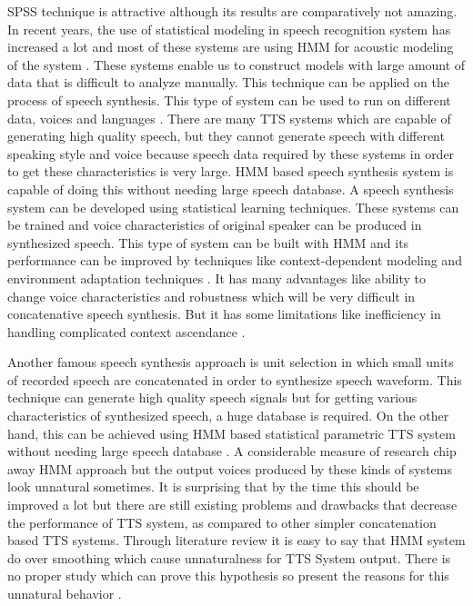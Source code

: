 SPSS technique is attractive although its results are comparatively not amazing. In recent years, the use of statistical modeling in speech recognition system has increased a lot and most of these systems are using HMM for acoustic modeling of the system \cite{donovan1999hidden}. These systems enable us to construct models with large amount of data that is difficult to analyze manually. This technique can be applied on the process of speech synthesis. This type of system can be used to run on different data, voices and languages \cite{donovan1999hidden}. There are many TTS systems which are capable of generating high quality speech, but they cannot generate speech with different speaking style and voice because speech data required by these systems in order to get these characteristics is very large. HMM based speech synthesis system \cite{tokuda2002hmm} is capable of doing this without needing large speech database. A speech synthesis system can be developed using statistical learning techniques. These systems can be trained and voice characteristics of original speaker can be produced in synthesized speech. This type of system can be built with HMM and its performance can be improved by techniques like context-dependent modeling and environment adaptation techniques \cite{tokuda2000speech}. It has many advantages like ability to change voice characteristics and robustness which will be very difficult in concatenative speech synthesis. But it has some limitations like inefficiency in handling complicated context ascendance \cite{ze2013statistical}.

Another famous speech synthesis approach is unit selection in which small units of recorded speech are concatenated in order to synthesize speech waveform. This technique can generate high quality speech signals but for getting various characteristics of synthesized speech, a huge database is required. On the other hand, this can be achieved using HMM based statistical parametric TTS system without needing large speech database \cite{zen2007hmm}. A considerable measure of research chip away HMM approach but the output voices produced by these kinds of systems look unnatural sometimes. It is surprising that by the time this should be improved a lot but there are still existing problems and drawbacks that decrease the performance of TTS system, as compared to other simpler concatenation based TTS systems. Through literature review it is easy to say that HMM system do over smoothing which cause unnaturalness for TTS System output. There is no proper study which can prove this hypothesis so \cite{merritt2013investigating} present the reasons for this unnatural behavior \cite{merritt2013investigating}.

